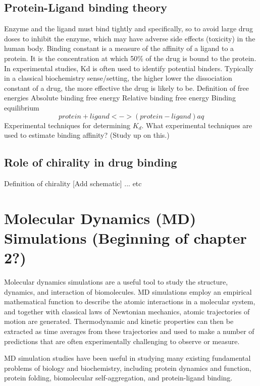 \subsection{Protein-Ligand binding theory}
\begin{outline}
	\1 Enzyme and the ligand must bind tightly and specifically, so to avoid large drug doses to inhibit the enzyme, which may have adverse side effects (toxicity) in the human body.
	\1 Binding constant is a measure of the affinity of a ligand to a protein. It is the concentration at which 50\% of the drug is bound to the protein. In experimental studies, Kd is often used to identify potential binders. Typically in a classical biochemistry sense/setting, the higher lower the dissociation constant of a drug, the more effective the drug is likely to be.
	\1 Definition of free energies
		\2 Absolute binding free energy
		\2 Relative binding free energy
		\2 Binding equilibrium
			\[ protein+ligand <-> (protein-ligand)aq \]
	\1 Experimental techniques for determining $K_d$. 
		\2 What experimental techniques are used to estimate binding affinity? (Study up on this.)
\end{outline}	

\subsection{Role of chirality in drug binding}
Definition of chirality [Add schematic] ... etc


\section{Molecular Dynamics (MD) Simulations (Beginning of chapter 2?)}
\begin{outline}
\1 Molecular dynamics simulations are a useful tool to study the structure, dynamics, and interaction of biomolecules. MD simulations employ an empirical mathematical function to describe the atomic interactions in a molecular system, and together with classical laws of Newtonian mechanics, atomic trajectories of motion are generated. Thermodynamic and kinetic properties can then be extracted as time averages from these trajectories and used to make a number of predictions that are often experimentally challenging to observe or measure.

\1 MD simulation studies have been useful in studying many existing fundamental problems of biology and biochemistry, including protein dynamics and function, protein folding, biomolecular self-aggregation, and protein-ligand binding.
\end{outline}

